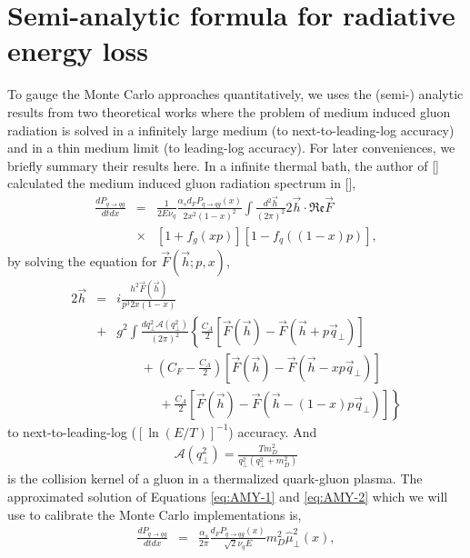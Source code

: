 \documentclass[aps, prc, reprint, amsmath, groupedaddress, nofootinbib]{revtex4-1}
\begin{document}
\section{Semi-analytic formula for radiative energy loss}\label{section:Theo}
To gauge the Monte Carlo approaches quantitatively, we uses the (semi-) analytic results from two theoretical works where the problem of medium induced gluon radiation is solved in a infinitely large medium (to next-to-leading-log accuracy) and in a thin medium limit (to leading-log accuracy).
For later conveniences, we briefly summary their results here.
In a infinite thermal bath, the author of [] calculated the medium induced gluon radiation spectrum in [],
\begin{eqnarray}\label{eq:AMY-1}
\nonumber
\frac{dP_{q\rightarrow qg}}{dt dx} &=& \frac{1}{2E\nu_q} \frac{\alpha_s d_F P_{q\rightarrow qg}(x)}{2x^2(1-x)^2}\int\frac{d^2\vec{h}}{(2\pi)^2}2\vec{h}\cdot \mathfrak{Re} \vec{F} \\
&\times& [1+f_g(xp)][1-f_q((1-x)p)],
\end{eqnarray}
by solving the equation for $\vec{F}(\vec{h}; p, x)$,
\begin{eqnarray}\label{eq:AMY-2}
\nonumber
2\vec{h} &=& i\frac{h^2 \vec{F}(\vec{h})}{p^3 2x(1-x)} \\
\nonumber
&+& g^2\int \frac{dq_\perp^2 \mathcal{A}(q_\perp^2)}{(2\pi)^2}\left\{\frac{C_A}{2}\left[\vec{F}(\vec{h}) - \vec{F}(\vec{h}+p\vec{q}_\perp)\right]\right. \\
\nonumber
&& \phantom{ssss} + \left(C_F - \frac{C_A}{2}\right)\left[\vec{F}(\vec{h}) - \vec{F}(\vec{h}-xp\vec{q}_\perp)\right] \\
&& \phantom{sssssss} + \left. \frac{C_A}{2}\left[\vec{F}(\vec{h}) - \vec{F}(\vec{h}-(1-x)p\vec{q}_\perp)\right] \right\}
\end{eqnarray}
to next-to-leading-log ($[\ln(E/T)]^{-1}$) accuracy.
And
\begin{eqnarray}
\mathcal{A}(q_\perp^2) = \frac{T m_D^2}{q_\perp^2(q_\perp^2+m_D^2)}
\end{eqnarray}
is the collision kernel of a gluon in a thermalized quark-gluon plasma.
The approximated solution of Equations \ref{eq:AMY-1} and \ref{eq:AMY-2} which we will use to calibrate the Monte Carlo implementations is,
\begin{eqnarray}\label{eq:AMY-NLL}
\frac{dP_{q\rightarrow qg}}{dt dx} &=& \frac{\alpha_s}{2\pi}\frac{ d_F P_{q\rightarrow qg}(x)}{\sqrt{2}\nu_q E} m_D^2 \hat{\mu}_\perp^2(x),
\end{eqnarray}
\end{document}
